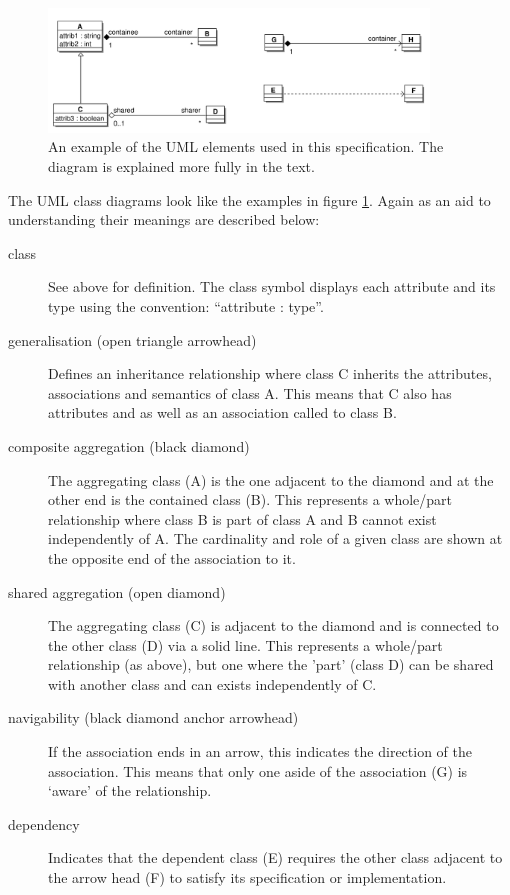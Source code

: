 %
\begin{figure}[htb]
\begin{center}
\includegraphics[width=0.9\textwidth]{images/exampleuml}
\caption{An example of the UML elements used in this
  specification. The diagram is explained more fully in the text.}
\label{fig:techref:umlexample}
\end{center}
\end{figure}
%
The UML class diagrams look like the examples in
figure \ref{fig:techref:umlexample}. Again as an aid to
understanding their meanings are described below:
\begin{description}
\item[class] See above for definition. The class symbol displays each
  attribute and its type using the convention: ``attribute : type''.
\item[generalisation (open triangle arrowhead)] Defines an inheritance
  relationship where class C inherits the attributes, associations and
  semantics of class A. This means that C also has attributes
   and  as well as an association
called  to class B.
\item[composite aggregation (black diamond)] The aggregating class
  (A) is the one adjacent to the diamond and at the other end is the
  contained class (B). This represents a whole/part
  relationship where class B is part of class A and B cannot exist
  independently of A. The cardinality and role of a given class are
  shown at the opposite end of the association to it.
\item[shared aggregation (open diamond)] The aggregating class (C) is
  adjacent to the diamond and is connected to the other class (D) via
  a solid line. This represents a whole/part relationship (as above), but one
  where the 'part' (class D) can be shared with another class and can
  exists independently of C.
\item[navigability (black diamond anchor arrowhead)] If the
  association ends in an arrow, this indicates the direction of the
  association. This means that only one aside of the association (G)
  is `aware' of the relationship.
\item[dependency] Indicates that the dependent class (E) requires the
  other class adjacent to the arrow head (F) to satisfy its
  specification or implementation.
\end{description}
